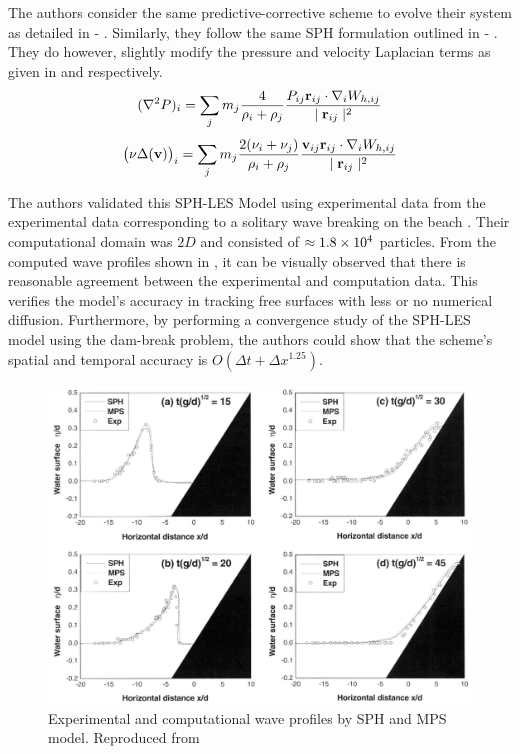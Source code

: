 The authors consider the same predictive-corrective scheme to evolve their system as detailed in  - .
Similarly, they follow the same SPH formulation outlined in  - . They do however, slightly modify the pressure and velocity Laplacian terms as given in  and  respectively.
\begin{equation}
    (\nabla^2 P)_i = \sum_j m_j \frac{4}{\rho_i + \rho_j} \frac{P_{ij} \mathbf{r}_{ij} \cdot \nabla_{i} W_{h, ij} }{\mid \mathbf{r}_{ij} \mid^{2}}
    \label{eq:Shao2005-P-laplacian-sph}
\end{equation}
\begin{equation}
    \big(\nu \Delta(\mathbf{v}) \big)_i = \sum_j m_j \frac{2(\nu_i + \nu_j)}{\rho_i + \rho_j}\frac{\mathbf{v}_{ij} \mathbf{r}_{ij} \cdot \nabla_{i} W_{h, ij}}{\mid \mathbf{r}_{ij} \mid^{2}}
    \label{eq:Shao2005-vel-laplacian-sph}
\end{equation}

The authors validated this SPH-LES Model using experimental data from the experimental data corresponding to a solitary wave breaking on the beach \parencite{Synolakis1986}. Their computational domain was $2D$ and consisted of $\approx 1.8 \times {10}^{4}$ particles. 
From the computed wave profiles shown in , it can be visually observed that there is reasonable agreement between the experimental and computation data. This verifies the model’s accuracy in tracking free surfaces with less or no numerical diffusion.
Furthermore, by performing a convergence study of the SPH-LES model using the dam-break problem, the authors could show that the scheme’s spatial and temporal accuracy is $O(\Delta t + \Delta x^{1.25})$.

\begin{figure}[H]
    \centering
    \includegraphics[scale=0.6]{Figures/research_papers/shao2005-wave-profile-result.png}
    \caption{Experimental and computational wave profiles by SPH and MPS model. Reproduced from \cite{Shao2005}}
    \label{fig:shao2005-wave-profile-result}
\end{figure}


